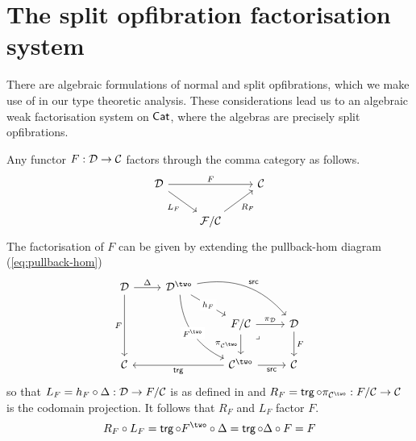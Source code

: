 \section*{The split opfibration factorisation system}

There are algebraic formulations of normal and split opfibrations,
which we make use of in our type theoretic analysis.
These considerations lead us to
an algebraic weak factorisation system on $\mathsf{Cat}$,
where the algebras are precisely split opfibrations.

Any functor $F : \mathcal{D} \to \mathcal{C}$ factors through the
comma category as follows.
\[ \begin{tikzcd}
  \DD && \CC \\
  & {\FF / \CC}
  \arrow["F", from=1-1, to=1-3]
  \arrow["{L_F}"', from=1-1, to=2-2]
  \arrow["{R_F}"', from=2-2, to=1-3]
\end{tikzcd} \]
The factorisation of $F$ can be given by extending the pullback-hom
diagram (\cref{eq:pullback-hom})
\[
\begin{tikzcd}
  \DD & {\DD^\two} && \\
  && {F / \CC} & \DD \\
  \CC && {\CC^\two} & \CC
  \arrow["\Delta", from=1-1, to=1-2]
  \arrow["F"', from=1-1, to=3-1]
  \arrow["{h_F}"{description}, from=1-2, to=2-3]
  \arrow["\src", bend left, from=1-2, to=2-4]
  \arrow["\pi_\DD", from=2-3, to=2-4]
  \arrow["{\pi_{\CC^\two}}"', from=2-3, to=3-3]
  \arrow["\lrcorner"{anchor=center, pos=0.125}, draw=none, from=2-3, to=3-4]
  \arrow["F", from=2-4, to=3-4]
  \arrow["\trg", from=3-3, to=3-1]
  \arrow["\src"', from=3-3, to=3-4]
  \arrow["F^\two"{description}, bend right, from=1-2, to=3-3]
\end{tikzcd}
\]
so that $L_F = h_F \circ \Delta : \mathcal{D} \to F / \mathcal{C}$ is as defined in
and $R_F = \trg \circ \pi_{\CC^\two} : F / \CC \to \CC$ is the codomain projection.
It follows that $R_F$ and $L_F$ factor $F$.
\[R_F \circ L_F = \trg \circ F^\two \circ \Delta = \trg \circ \Delta \circ F = F\]

